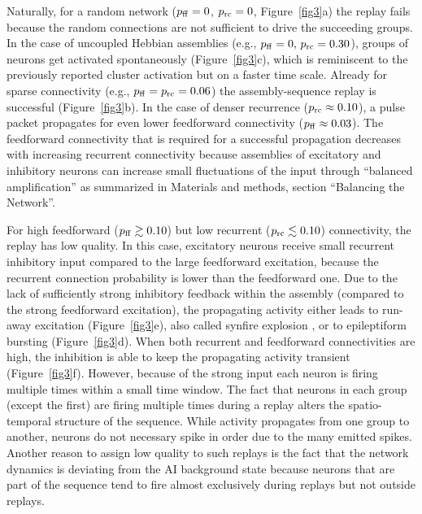     Naturally, for a random network ($p_{\rm ff} = 0$, $p_{\rm rc} = 0$,
    Figure~\ref{fig3}a) the replay fails because the random connections are not
    sufficient to drive the succeeding groups. In the case of uncoupled
    Hebbian assemblies (e.g., $p_{\rm ff}=0,\, p_{\rm rc} = 0.30$), groups of
    neurons get activated spontaneously (Figure~\ref{fig3}c), which is reminiscent
    to the previously reported cluster activation \citep{Litwin2012} but
    on a faster time scale. Already for sparse connectivity (e.g., $p_{\rm ff}=
    p_{\rm rc} = 0.06$) the assembly-sequence replay is successful
    (Figure~\ref{fig3}b). In the case of denser recurrence ($p_{\rm rc} \approx
    0.10$), a pulse packet propagates for even lower feedforward connectivity
    ($p_{\rm ff} \approx 0.03$). The feedforward connectivity that is required
    for a successful propagation decreases with increasing recurrent
    connectivity because assemblies of excitatory and inhibitory neurons can
    increase small fluctuations of the input through ``balanced amplification''
    \citep{Murphy2009, Hennequin2012} as summarized in Materials and methods,
    section ``Balancing the Network''.

    For high feedforward ($p_{\rm ff} \gtrsim 0.10$) but low recurrent ($p_{\rm
    rc} \lesssim  0.10$) connectivity, the replay has low quality. In this
    case, excitatory neurons receive small recurrent inhibitory input compared
    to the large feedforward excitation, because the recurrent connection
    probability is lower than the feedforward one. Due to the lack of
    sufficiently strong inhibitory feedback within the assembly (compared to
    the strong feedforward excitation), the propagating activity either leads
    to run-away excitation (Figure~\ref{fig3}e), also called synfire explosion
    \citep{Mehring2003, Aviel2004}, or to epileptiform bursting
    (Figure~\ref{fig3}d). When both recurrent and feedforward connectivities are
    high, the inhibition is able to keep the propagating activity transient
    (Figure~\ref{fig3}f). However, because of the strong input each neuron is
    firing multiple times within a small time window. The fact that neurons in
    each group (except the first) are firing multiple times during a replay
    alters the spatio-temporal structure of the sequence. While activity
    propagates from one group to another, neurons do not necessary spike in
    order due to the many emitted spikes. Another reason to assign low quality
    to such replays is the fact that the network dynamics is deviating from the
    AI background state because neurons that are part of the sequence tend to
    fire almost exclusively during replays but not outside replays.


